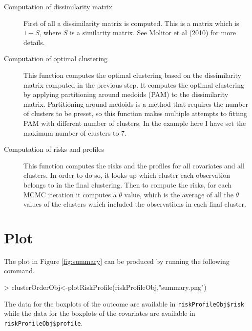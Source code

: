 \documentclass{article}
\begin{document}
\begin{description}
\item[Computation of dissimilarity matrix] First of all a dissimilarity matrix is computed. This is a matrix which is $1-S$, where $S$ is a similarity matrix. See \cite{Molitor10} Molitor et al (2010) for more details.   
\item[Computation of optimal clustering] This function computes the optimal clustering based on the dissimilarity matrix computed in the previous step. It computes the optimal clustering by applying partitioning around medoids (PAM) to the dissimilarity matrix. Partitioning around medoids is a method that requires the number of clusters to be preset, so this function makes multiple attempts to fitting PAM with different number of clusters. In the example here I have set the maximum number of clusters to 7. 
\item[Computation of risks and profiles] This function computes the risks and the profiles for all covariates and all clusters. In order to do so, it looks up which cluster each observation belongs to in the final clustering. Then to compute the risks, for each MCMC iteration it computes a $\theta$ value, which is the average of all the $\theta$ values of the clusters which included the observations in each final cluster.  
\end{description}

\section{Plot}
The plot in Figure \ref{fig:summary} can be produced by running the following command. 
\begin{Schunk}
\begin{Sinput}
> clusterOrderObj<-plotRiskProfile(riskProfileObj,"summary.png")
\end{Sinput}
\end{Schunk}
The data for the boxplots of the outcome are available in \verb|riskProfileObj$risk| while the data for the boxplots of the covariates are available in \verb|riskProfileObj$profile|.
\end{document}
